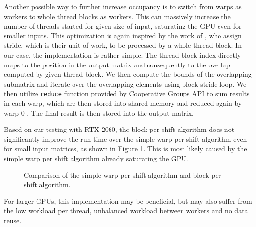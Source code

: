 
Another possible way to further increase occupancy is to switch from warps as workers to whole thread blocks as workers. This can massively increase the number of threads started for given size of input, saturating the GPU even for smaller inputs. This optimization is again inspired by the work of \citet{paper:levenstein}, who assign stride, which is their unit of work, to be processed by a whole thread block. In our case, the implementation is rather simple. The thread block index directly maps to the position in the output matrix and consequently to the overlap computed by given thread block. We then compute the bounds of the overlapping submatrix and iterate over the overlapping elements using block stride loop. We then utilize \texttt{reduce} function provided by Cooperative Groups API to sum results in each warp, which are then stored into shared memory and reduced again by warp 0 \citep{site:cuda_reduction}. The final result is then stored into the output matrix. 

Based on our testing with RTX 2060, the block per shift algorithm does not significantly improve the run time over the simple warp per shift algorithm even for small input matrices, as shown in Figure \ref{fig:block_per_shift_local_results}. This is most likely caused by the simple warp per shift algorithm already saturating the GPU. 

\begin{figure}[ht]
	\centering
	\def\svgwidth{0.4\textwidth}
	
	\caption{Comparison of the simple warp per shift algorithm and block per shift algorithm.}
	\label{fig:block_per_shift_local_results}
\end{figure}

For larger GPUs, this implementation may be beneficial, but may also suffer from the low workload per thread, unbalanced workload between workers and no data reuse.



